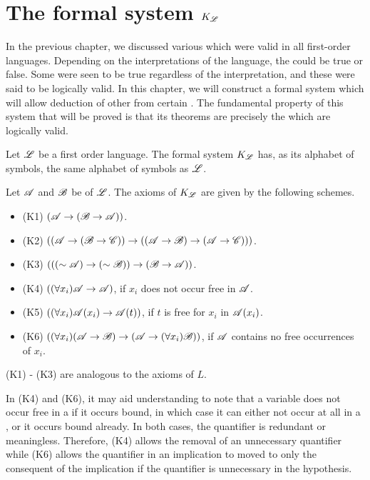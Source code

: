 \section{The formal system \texorpdfstring{\(K_{\mathscr{L}}\)}{KL}}

In the previous chapter, we discussed various \wfs{} which were valid in all first-order languages. Depending on the interpretations of the language, the \wfs{} could be true or false. Some \wfs{} were seen to be true regardless of the interpretation, and these \wfs{} were said to be logically valid. In this chapter, we will construct a formal system which will allow deduction of other \wfs{} from certain \wfs{}. The fundamental property of this system that will be proved is that its theorems are precisely the \wfs{} which are logically valid.
  
Let \(\mathscr{L}\) be a first order language. The formal system \(K_{\mathscr{L}}\) has, as its alphabet of symbols, the same alphabet of symbols as \(\mathscr{L}\).

Let \(\mathscr{A}\) and \(\mathscr{B}\) be \wfs{} of \(\mathscr{L}\). The axioms of \(K_{\mathscr{L}}\) are given by the following schemes.
\begin{itemize}
  \item (K1) \((\mathscr{A} \rightarrow (\mathscr{B} \rightarrow \mathscr{A}))\).

  \item (K2) \(((\mathscr{A} \rightarrow (\mathscr{B} \rightarrow \mathscr{C})) \rightarrow ((\mathscr{A} \rightarrow \mathscr{B}) \rightarrow (\mathscr{A} \rightarrow \mathscr{C})))\).

  \item (K3) \((((\sim \mathscr{A}) \rightarrow (\sim \mathscr{B})) \rightarrow (\mathscr{B} \rightarrow \mathscr{A}))\).

  \item (K4) \(((\forall x_i) \mathscr{A} \rightarrow \mathscr{A})\), if \(x_i\) does not occur free in \(\mathscr{A}\).

  \item (K5) \(((\forall x_i) \mathscr{A}(x_i) \rightarrow \mathscr{A}(t))\), if \(t\) is free for \(x_i\) in \(\mathscr{A}(x_i)\).

  \item (K6) \(((\forall x_i)(\mathscr{A} \rightarrow \mathscr{B}) \rightarrow (\mathscr{A} \rightarrow (\forall x_i)\mathscr{B}))\), if \(\mathscr{A}\) contains no free occurrences of \(x_i\).
\end{itemize}

\note{} (K1) - (K3) are analogous to the axioms of \(L\).

\note{} In (K4) and (K6), it may aid understanding to note that a variable does not occur free in a \wf{} if it occurs bound, in which case it can either not occur at all in a \wf{}, or it occurs bound already. In both cases, the quantifier is redundant or meaningless. Therefore, (K4) allows the removal of an unnecessary quantifier while (K6) allows the quantifier in an implication to moved to only the consequent of the implication if the quantifier is unnecessary in the hypothesis.

